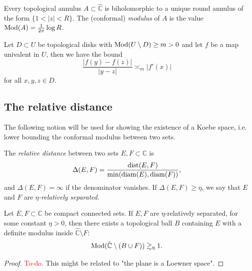 \begin{definition}
	Every topological annulus $A \subset \hat{\mathbb C}$ is biholomorphic to 
	a unique round annulus of the form $\{ 1<|z|<R \}$. 
	The (conformal) \emph{modulus} of $A$ is the value $\operatorname{Mod}(A) = \frac 1{2\pi} \log R$. 


\end{definition}
\begin{theorem}  \label{Koebe}
	Let $D \subset U $ be topological disks with $\operatorname{Mod}(U \setminus D)  \geq m>0$
	 and let $f$ be a map univalent in $U$,
	then we have the bound 
	\begin{equation}
		\frac {|f(y)-f(z)|}{|y-z|} \asymp_m |f'(x)|
	\end{equation}
	for all $x,y,z \in D$.
\end{theorem}

\subsection{The relative distance}

The following notion will be used for showing the existence of a Koebe space, i.e. lower bounding the conformal modulus between two sets.
\begin{definition}
	The \emph{relative distance} between two sets $E,F \subset \mathbb C$ is 
	\begin{equation}
		\Delta(E,F) = \frac{\operatorname{dist}(E,F)}{\min(\operatorname{diam}(E), \operatorname{diam}(F))},	
	\end{equation}
	and $\Delta(E,F) = \infty$ if the denominator vanishes.
	If $\Delta(E,F) \geq \eta$, we say that $E$ and $F$ are 
	\emph{$\eta$-relatively separated.}
\end{definition}

\begin{theorem} \label{thm: rel-dist-bounds-modulus}
	Let $E,F \subset \mathbb C$ be compact connected sets.
	If $E,F$ are $\eta$-relatively separated, for some constant $\eta>0$,
	then there exists a topological ball $B$ containing $E$ with a definite modulus inside $\hat{\mathbb C} \setminus F$:
	\begin{equation}
		\operatorname{Mod} (\hat{\mathbb C} \setminus (B \cup F)) \gtrsim _\eta 1.
	\end{equation}
\end{theorem}

\begin{proof}
	\textcolor{red}{To-do.} This might be related to "the plane is a Loewner space".
\end{proof}


